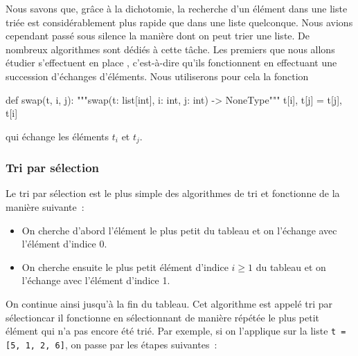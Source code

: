 \documentclass{magnoliaold}
\begin{document}
\vspace{2ex}
Nous savons que, grâce à la dichotomie, la recherche d'un élément dans une liste triée est
considérablement plus rapide que dans une liste quelconque. Nous avions cependant passé sous silence la manière dont
on peut trier une liste. De nombreux algorithmes sont dédiés à cette tâche. Les premiers que nous allons étudier
s'effectuent \og en place \fg, c'est-à-dire qu'ils fonctionnent en effectuant une succession d'échanges d'éléments.
Nous utiliserons pour cela la fonction
\begin{pythoncode}
def swap(t, i, j):
    """swap(t: list[int], i: int, j: int) -> NoneType"""
    t[i], t[j] = t[j], t[i]
\end{pythoncode}
\noindent
qui échange les éléments $t_i$ et $t_j$.

\subsubsection{Tri par sélection}

Le tri par sélection est le plus simple des algorithmes de tri et fonctionne de
la manière suivante~:
\begin{itemize}
\item On cherche d'abord l'élément le plus petit du tableau et on l'échange avec
  l'élément d'indice 0.
\item On cherche ensuite le plus petit élément d'indice $i\geq 1$ du tableau et
  on l'échange avec l'élément d'indice 1.
\end{itemize}
On continue ainsi jusqu'à la fin du tableau. Cet algorithme
est appelé \og tri par sélection\fg car il fonctionne en sélectionnant de
manière répétée le plus petit élément qui n'a pas encore été trié. Par exemple,
si on l'applique sur la liste \verb!t = [5, 1, 2, 6]!, on passe par les étapes
suivantes~: 
\end{document}
